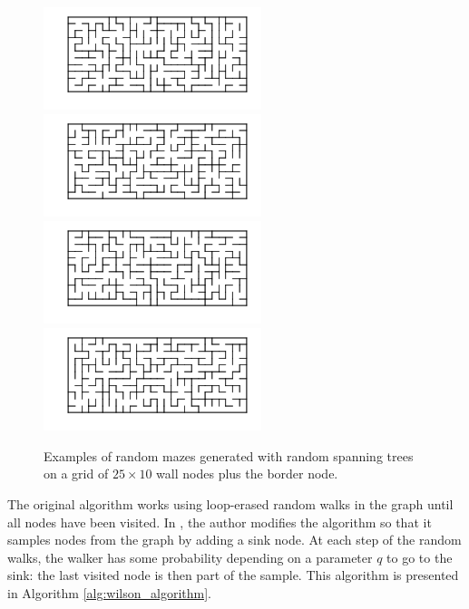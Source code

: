 \documentclass{article}
\begin{document}
\begin{figure}[ht]
\centering
\includegraphics[height=3cm]{maze1.png}
\includegraphics[height=3cm]{maze2.png}
\includegraphics[height=3cm]{maze3.png}
\includegraphics[height=3cm]{maze4.png}
\caption{Examples of random mazes generated with random spanning trees on a grid of $25\times10$ wall nodes plus the border node.}\label{fig:randommazes}
\end{figure}


The original algorithm works using loop-erased random walks in the graph until all nodes have been visited. In \cite{tremblay2017}, the author modifies the algorithm so that it samples nodes from the graph by adding a sink node. At each step of the random walks, the walker has some probability depending on a parameter $q$ to go to the sink: the last visited node is then part of the sample. This algorithm is presented in Algorithm \ref{alg:wilson_algorithm}.
\end{document}
